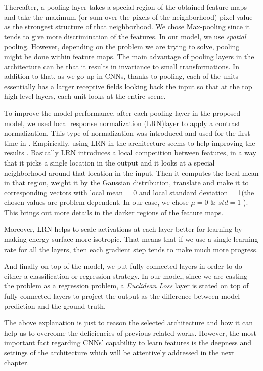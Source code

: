 \indent Thereafter, a pooling layer takes a special region of the obtained feature maps and take the maximum (or sum over the pixels of the neighborhood) pixel value as the strongest structure of that neighborhood. We chose Max-pooling since it tends to give more discrimination of the features\cite{boureau2010theoretical}. In our model, we use \textit{spatial} pooling. However, depending on the problem we are trying to solve, pooling might be done within feature maps\cite{goodfellow2013maxout}.  The main advantage of pooling layers in the architecture can be that it results in invariance to small transformations. In addition to that, as we go up in CNNs, thanks to pooling, each of the units essentially has a larger receptive fields looking back the input so that at the top high-level layers, each unit looks at the entire scene.  

To improve the model performance, after each pooling layer in the proposed model, we used local response normalization (LRN)layer to apply a contrast normalization. This type of normalization was introduced and used for the first time in \cite{krizhevsky2012imagenet}. Empirically, using LRN in the architecture seems to help improving the results \cite{jarrett2009best, krizhevsky2012imagenet}. Basically LRN introduces a local competition between features, in a way that it picks a single location in the output and it looks at a special neighborhood around that location in the input. Then it computes the local mean in that region, weight it by the Gaussian distribution, translate and make it to corresponding vectors with local mean = 0 and local standard deviation = 1(the chosen values are problem dependent. In our case, we chose $\mu = 0$ \& $std = 1 $ ). This brings out more details in the darker regions of the feature maps. 

\indent Moreover, LRN helps to scale activations at each layer better for learning by making energy surface more isotropic. That means that if we use a single learning rate for all the layers, then each gradient step tends to make much more progress\cite{jarrett2009best}. 

And finally on top of the model, we put fully connected layers in order to do either a classification or regression strategy. In our model, since we are casting the problem as a regression problem, a \textit{Euclidean Loss} layer is stated on top of fully connected layers to project the output as the difference between model prediction and the ground truth. 

The above explanation is just to reason the selected architecture and how it can help us to overcome the deficiencies of previous related works. However, the most important fact regarding CNNs' capability to learn features is the deepness and settings of the architecture which will be attentively addressed in the next chapter.  


